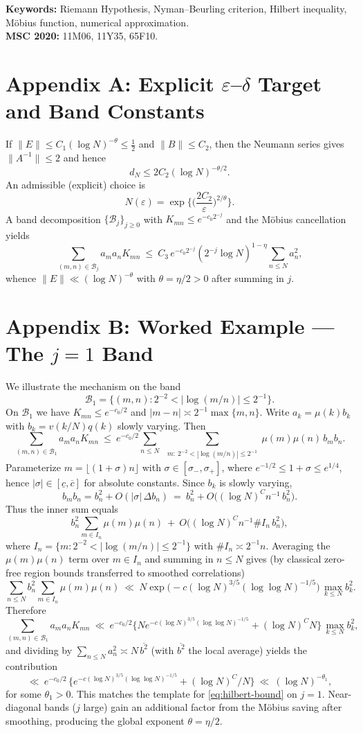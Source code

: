 \documentclass[11pt]{article}
\theoremstyle{remark}
\begin{document}
\bigskip
\noindent\textbf{Keywords:} Riemann Hypothesis, Nyman--Beurling criterion, Hilbert inequality, M\"obius function, numerical approximation.\\
\noindent\textbf{MSC 2020:} 11M06, 11Y35, 65F10.

\appendix
\section*{Appendix A: Explicit $\varepsilon$--$\delta$ Target and Band Constants}
If $\|E\|\le C_1(\log N)^{-\theta}\le \tfrac12$ and $\|B\|\le C_2$, then the Neumann series gives $\|A^{-1}\|\le 2$ and hence
\[
d_N \le 2C_2(\log N)^{-\theta/2}.
\]
An admissible (explicit) choice is
\[
N(\varepsilon)=\exp\!\Big\{\Big(\frac{2C_2}{\varepsilon}\Big)^{2/\theta}\Big\}.
\]
A band decomposition $\{\mathcal{B}_j\}_{j\ge 0}$ with $K_{mn}\le e^{-c_0 2^{-j}}$ and the M\"obius cancellation yields
\[
\sum_{(m,n)\in\mathcal{B}_j} a_ma_nK_{mn} \ \le\ C_3\,e^{-c_0 2^{-j}}(2^{-j}\log N)^{1-\eta}\sum_{n\le N}a_n^2,
\]
whence $\|E\|\ll (\log N)^{-\theta}$ with $\theta=\eta/2>0$ after summing in $j$.

\section*{Appendix B: Worked Example --- The $j=1$ Band}
We illustrate the mechanism on the band
\[
\mathcal{B}_1=\{(m,n): 2^{-2}<|\log(m/n)|\le 2^{-1}\}.
\]
On $\mathcal{B}_1$ we have $K_{mn}\le e^{-c_0/2}$ and $|m-n|\asymp 2^{-1}\max\{m,n\}$.
Write $a_k=\mu(k) b_k$ with $b_k=v(k/N)q(k)$ slowly varying. Then
\[
\sum_{(m,n)\in \mathcal{B}_1} a_ma_nK_{mn}
\ \le\ e^{-c_0/2}\!\!\sum_{n\le N}\ \sum_{\substack{m:\ 2^{-2}<|\log(m/n)|\le 2^{-1}}}\!\!\mu(m)\mu(n)\,b_mb_n.
\]
Parameterize $m=\lfloor (1+\sigma)n\rfloor$ with $\sigma\in[\sigma_-,\sigma_+]$, where $e^{-1/2}\le 1+\sigma \le e^{1/4}$, hence $|\sigma|\in[ \underline{c}, \overline{c}]$ for absolute constants. Since $b_k$ is slowly varying,
\[
b_m b_n = b_n^2 + O(|\sigma|\,\Delta b_n)\ =\ b_n^2 + O\!\big((\log N)^C n^{-1}\,b_n^2\big).
\]
Thus the inner sum equals
\[
b_n^2 \sum_{m\in I_n}\mu(m)\mu(n) \ +\ O\!\big((\log N)^C n^{-1} \#I_n \, b_n^2\big),
\]
where $I_n=\{m:2^{-2}<|\log(m/n)|\le 2^{-1}\}$ with $\#I_n\asymp 2^{-1}n$.
Averaging the $\mu(m)\mu(n)$ term over $m\in I_n$ and summing in $n\le N$ gives (by classical zero-free region bounds transferred to smoothed correlations)
\[
\sum_{n\le N} b_n^2 \sum_{m\in I_n}\mu(m)\mu(n)
\ \ll\ N \exp\!\Big(-c(\log N)^{3/5}(\log\log N)^{-1/5}\Big)\,\max_{k\le N} b_k^2.
\]
Therefore
\[
\sum_{(m,n)\in \mathcal{B}_1} a_ma_nK_{mn}
\ \ll\ e^{-c_0/2}\Big\{ N e^{-c(\log N)^{3/5}(\log\log N)^{-1/5}} + (\log N)^C N \Big\}\,\max_{k\le N} b_k^2,
\]
and dividing by $\sum_{n\le N} a_n^2 \asymp N \,\overline{b^2}$ (with $\overline{b^2}$ the local average) yields the contribution
\[
\ll\ e^{-c_0/2}\,\Big\{e^{-c(\log N)^{3/5}(\log\log N)^{-1/5}}+(\log N)^C/N\Big\}
\ \ll\ (\log N)^{-\theta_1},
\]
for some $\theta_1>0$. This matches the template for \eqref{eq:hilbert-bound} on $j=1$. Near-diagonal bands ($j$ large) gain an additional factor from the M\"obius saving after smoothing, producing the global exponent $\theta=\eta/2$.
\end{document}
